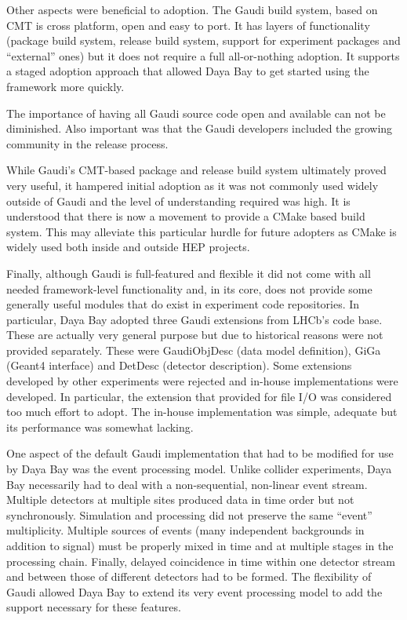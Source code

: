 Other aspects were beneficial to adoption.  The Gaudi build system,
based on CMT\cite{cmt} is cross platform, open and easy to port.  It has layers
of functionality (package build system, release build system, support
for experiment packages and ``external'' ones) but it does not require a full
all-or-nothing adoption.  It supports a staged adoption approach that
allowed Daya Bay to get started using the framework more quickly.

The importance of having all Gaudi source code open and available can
not be diminished.  Also important was that the Gaudi developers included
the growing community in the release process.

While Gaudi's CMT-based package and release build system ultimately
proved very useful, it hampered initial adoption as it was not commonly
used widely outside  of Gaudi and the level of understanding required was high.  
It is understood that there is now a
movement to provide a CMake based build system.  This may alleviate
this particular hurdle for future adopters as CMake is widely used both inside and outside HEP projects.

Finally, although Gaudi is full-featured and flexible it did not come
with all needed framework-level functionality and, in its core, does
not provide some generally useful modules that do exist in experiment code repositories.  In particular, Daya Bay
adopted three Gaudi extensions from LHCb's code base.  These are
actually very general purpose but due to historical reasons were not
provided separately.  These were GaudiObjDesc (data model definition),
GiGa (Geant4 interface) and DetDesc (detector description).  Some
extensions developed by other experiments were rejected and in-house
implementations were developed.  In particular, the extension that
provided for file I/O was considered too much effort to adopt.  The
in-house implementation was simple, adequate but its performance was
somewhat lacking.

One aspect of the default Gaudi implementation that had to be modified
for use by Daya Bay was the event processing model.  Unlike collider
experiments, Daya Bay necessarily had to deal with a non-sequential,
non-linear event stream.  Multiple detectors at multiple sites
produced data in time order but not synchronously.  Simulation and
processing did not preserve the same ``event'' multiplicity.  Multiple
sources of events (many independent backgrounds in addition to signal)
must be properly mixed in time and at multiple stages in the
processing chain.  Finally, delayed coincidence in time within one
detector stream and between those of different detectors had to be
formed.  The flexibility of Gaudi allowed Daya Bay to extend its very
event processing model to add the support necessary for these
features.

